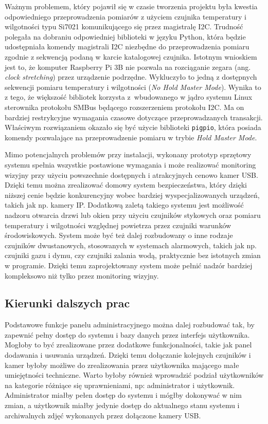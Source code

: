 \documentclass[a4paper,11pt,twoside]{article}
\begin{document}
Ważnym problemem, który pojawił się w czasie tworzenia projektu była kwestia odpowiedniego przeprowadzenia pomiarów z użyciem czujnika temperatury i wilgotności typu Si7021 komunikującego się przez magistralę I2C. Trudność polegała na dobraniu odpowiedniej biblioteki w języku Python, która będzie udostępniała komendy magistrali I2C niezbędne do przeprowadzenia pomiaru zgodnie z sekwencją podaną w karcie katalogowej czujnika. Istotnym wnioskiem jest to, że komputer Raspberry Pi 3B nie pozwala na rozciąganie zegara (ang. \textit{clock stretching}) przez urządzenie podrzędne. Wykluczyło to jedną z dostępnych sekwencji pomiaru temperatury i wilgotności (\textit{No Hold Master Mode}). Wynika to z tego, że większość bibliotek korzysta z~wbudowanego w jądro systemu Linux sterownika protokołu SMBus będącego rozszerzeniem protokołu I2C. Ma on bardziej restrykcyjne wymagania czasowe dotyczące przeprowadzanych transakcji. Właściwym rozwiązaniem okazało się być użycie biblioteki \texttt{pigpio}, która posiada komendy pozwalające na przeprowadzenie pomiaru w trybie \textit{Hold Master Mode}.

Mimo potencjalnych problemów przy instalacji, wykonany prototyp sprzętowy systemu spełnia wszystkie postawione wymagania i może realizować monitoring wizyjny przy użyciu powszechnie dostępnych i atrakcyjnych cenowo kamer USB. Dzięki temu można zrealizować domowy system bezpieczeństwa, który dzięki niższej cenie będzie konkurencyjny wobec bardziej wyspecjalizowanych urządzeń, takich jak np. kamery IP. Dodatkową zaletą takiego systemu jest możliwość nadzoru otwarcia drzwi lub okien przy użyciu czujników stykowych oraz pomiaru temperatury i wilgotności względnej powietrza przez czujniki warunków środowiskowych. System może być też dalej rozbudowany o inne rodzaje czujników dwustanowych, stosowanych w systemach alarmowych, takich jak np. czujniki gazu i dymu, czy czujniki zalania wodą, praktycznie bez istotnych zmian w programie. Dzięki temu zaprojektowany system może pełnić nadzór bardziej kompleksowo niż tylko przez monitoring wizyjny.

\subsection{Kierunki dalszych prac}

Podstawowe funkcje panelu administracyjnego można dalej rozbudować tak, by zapewnić pełny dostęp do systemu i bazy danych przez interfejs użytkownika. Mogłoby to być zrealizowane przez dodatkowe funkcjonalności, takie jak panel dodawania i usuwania urządzeń. Dzięki temu dołączanie kolejnych czujników i kamer byłoby możliwe do zrealizowania przez użytkownika mającego małe umiejętności techniczne. Warto byłoby również wprowadzić podział użytkowników na kategorie różniące się uprawnieniami, np: administrator i użytkownik. Administrator miałby pełen dostęp do systemu i mógłby dokonywać w nim zmian, a użytkownik miałby jedynie dostęp do aktualnego stanu systemu i archiwalnych zdjęć wykonanych przez dołączone kamery USB.
\end{document}
